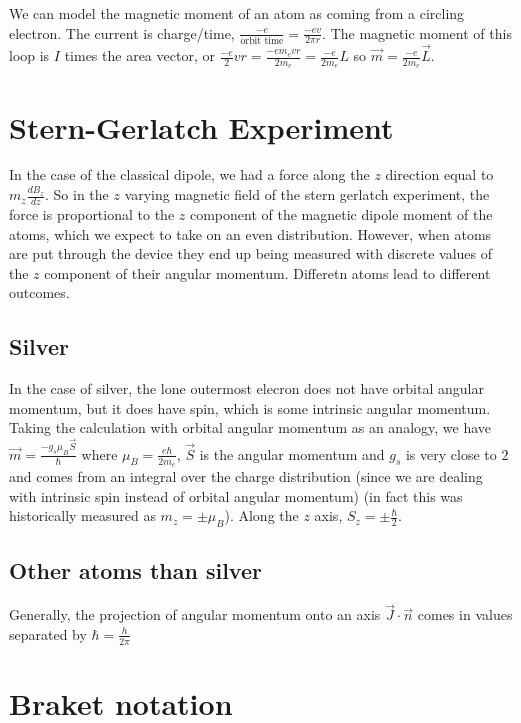 \documentclass{homework}
\begin{document}
We can model the magnetic moment of an atom as coming from a circling electron. The current is charge/time, $\frac{-e}{\text{orbit time}} = \frac{-ev}{2\pi r}$. The magnetic moment of this loop is $I$ times the area vector, or $\frac{-e}{2}vr = \frac{-e m_e vr}{2m_e} = \frac{-e}{2m_e}L$ so $\vec{m} = \frac{-e}{2m_e}\vec{L}$. 


\section{Stern-Gerlatch Experiment}

In the case of the classical dipole, we had a force along the $z$ direction equal to $m_z\frac{dB_z}{dz}$. So in the $z$ varying magnetic field of the stern gerlatch experiment, the force is proportional to the $z$ component of the magnetic dipole moment of the atoms, which we expect to take on an even distribution. However, when atoms are put through the device they end up being measured with discrete values of the $z$ component of their angular momentum. Differetn atoms lead to different outcomes. 

\subsection{Silver}

In the case of silver, the lone outermost elecron does not have orbital angular momentum, but it does have spin, which is some intrinsic angular momentum. Taking the calculation with orbital angular momentum as an analogy, we have $\vec{m} = \frac{-g_s \mu_B \vec{S}}{\hbar}$ where $\mu_B = \frac{e \hbar}{2m_e}$, $\vec{S}$ is the angular momentum and $g_s$ is very close to $2$ and comes from an integral over the charge distribution (since we are dealing with intrinsic spin instead of orbital angular momentum) (in fact this was historically measured as $m_z = \pm \mu_B$). Along the $z$ axis, $S_z = \pm \frac{\hbar}{2}$.

\subsection{Other atoms than silver}

Generally, the projection of angular momentum onto an axis $\vec{J} \cdot \vec{n}$ comes in values separated by $\hbar = \frac{h}{2\pi}$

\section{Braket notation}
\end{document}
